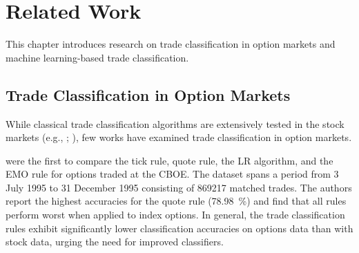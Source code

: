 \section{Related Work}\label{sec:related-work}

This chapter introduces research on trade classification in option markets and machine learning-based trade classification.

\subsection{Trade Classification in Option Markets}
\label{sec:trade-classification-in-option-markets}

While classical trade classification algorithms are extensively tested in the stock markets (e.g., \textcite[\checkmark][3806--3821]{chakrabartyTradeClassificationAlgorithms2007}; \textcite[\checkmark][259--286]{odders-whiteOccurrenceConsequencesInaccurate2000}), few works have examined trade classification in option markets.

\textcite[\checkmark][883--887]{savickasInferringDirectionOption2003} were the first to compare the tick rule, quote rule, the \gls{LR} algorithm, and the \gls{EMO} rule for options traded at the \gls{CBOE}. The dataset spans a period from 3 July 1995 to 31 December 1995 consisting of \num{869217} matched trades. The authors report the highest accuracies for the quote rule (\SI{78.98}{\percent}) and find that all rules perform worst when applied to index options. In general, the trade classification rules exhibit significantly lower classification accuracies on options data than with stock data, urging the need for improved classifiers.

